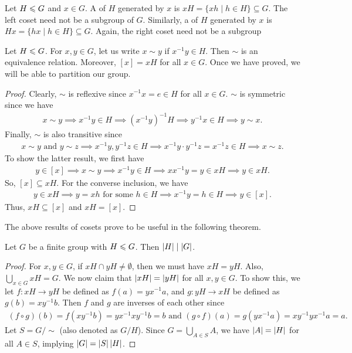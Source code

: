 \begin{definition}
    Let $H \leqslant G$ and $x \in G$. A  of $H$ generated by $x$ is $xH = \{xh \mid h \in H\} \subseteq G$. The left coset need not be a subgroup of $G$. Similarly, a  of $H$ generated by $x$ is $Hx = \{hx \mid h \in H\} \subseteq G$. Again, the right coset need not be a subgroup
\end{definition}

Let $H \leqslant G$. For $x,y \in G$, let us write $x \sim y$ if $x^{-1}y \in H$. Then $\sim$ is an equivalence relation. Moreover, $[x] = xH$ for all $x \in G$. Once we have proved, we will be able to partition our group.

\begin{proof}
    Clearly, $\sim$ is reflexive since $x^{-1}x = e \in H$ for all $x \in G$. $\sim$ is symmetric since we have
    \begin{align}
        x \sim y \implies x^{-1}y \in H \implies (x^{-1}y)^{-1} H \implies y^{-1}x \in H \implies y \sim x.
    \end{align}
    Finally, $\sim$ is also transitive since
    \begin{align}
        x \sim y \text{ and } y \sim z \implies x^{-1}y,y^{-1}z \in H \implies x^{-1}y \cdot y^{-1}z = x^{-1}z \in H \implies x \sim z.
    \end{align}
    To show the latter result, we first have
    \begin{align}
        y \in [x] \implies x \sim y \implies x^{-1}y \in H \implies xx^{-1}y = y \in xH \implies y \in xH.
    \end{align}
    So, $[x] \subseteq xH$. For the converse inclusion, we have
    \begin{align}
        y \in xH \implies y = xh \text{ for some } h \in H \implies x^{-1}y = h \in H \implies y \in [x].
    \end{align}
    Thus, $xH \subseteq [x]$ and $xH = [x]$.
\end{proof}

The above results of cosets prove to be useful in the following theorem.

\begin{theorem}
    Let $G$ be a finite group with $H \leqslant G$. Then $\left| H \right| \mid \left| G \right|$.
\end{theorem}

\begin{proof}
    For $x,y \in G$, if $xH \cap yH \neq \emptyset$, then we must have $xH = yH$. Also, $\bigcup_{x \in G} xH = G$. We now claim that $\left| xH \right| = \left| yH \right|$ for all $x,y \in G$. To show this, we let $f:xH \to yH$ be defined as $f(a) = yx^{-1}a$, and $g:yH \to xH$ be defined as $g(b) = xy^{-1}b$. Then $f$ and $g$ are inverses of each other since
    \begin{align}
        (f \circ g)(b) = f(xy^{-1}b) = yx^{-1}xy^{-1}b = b \text{ and } (g \circ f)(a) = g(yx^{-1}a) = xy^{-1}yx^{-1}a = a.
    \end{align}
    Let $S = G/\sim$ (also denoted as $G/H$). Since $G = \bigcup_{A \in S} A$, we have $\left| A \right| = \left| H \right|$ for all $A \in S$, implying $\left| G \right| = \left| S \right| \left| H \right|$.
\end{proof}

